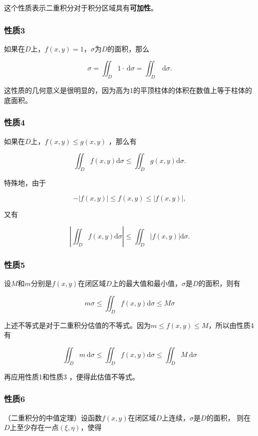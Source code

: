 \documentclass[12pt, a4paper]{article}
\numberwithin{equation}{section}
\begin{document}
    这个性质表示二重积分对于积分区域具有\textbf{可加性}。

\subsubsection{性质3}

    如果在$D$上，$f(x, y)=1$，$\sigma$为$D$的面积，那么

    $$
        \sigma=\iint_D 1 \cdot \mathrm{~d} \sigma=\iint_D \mathrm{~d} \sigma .
    $$

    这性质的几何意义是很明显的，因为高为1的平顶柱体的体积在数值上等于柱体的底面积。

\subsubsection{性质4}

    如果在$D$上，$f(x, y) \leq g(x, y)$ ，那么有
    
    $$
        \iint_D f(x, y) \mathrm{d} \sigma \leq \iint_D g(x, y) \mathrm{d} \sigma .
    $$

    特殊地，由于

    $$
    -|f(x, y)| \leq f(x, y) \leq|f(x, y)|,
    $$

    又有

    $$
        \left|\iint_D f(x, y) \mathrm{d} \sigma\right| \leq \iint_D|f(x, y)| \mathrm{d} \sigma .
    $$

\subsubsection{性质5}

    设$M$和$m$分别是$f(x, y)$在闭区域$D$上的最大值和最小值，$\sigma$是$D$的面积，则有
    
    $$
        m \sigma \leq \iint_D f(x, y) \mathrm{d} \sigma \leq M \sigma
    $$

    上述不等式是对于二重积分估值的不等式。因为$m \leq f(x, y) \leq M$，所以由性质4有

    $$
        \iint_D m \mathrm{~d} \sigma \leq \iint_D f(x, y) \mathrm{d} \sigma \leq \iint_D M \mathrm{~d} \sigma
    $$

    再应用性质1和性质3 ，便得此估值不等式。

\subsubsection{性质6}

    （二重积分的中值定理）设函数$f(x, y)$在闭区域$D$上连续，$\sigma$是$D$的面积，
    则在$D$上至少存在一点$(\xi, \eta)$，使得
\end{document}
